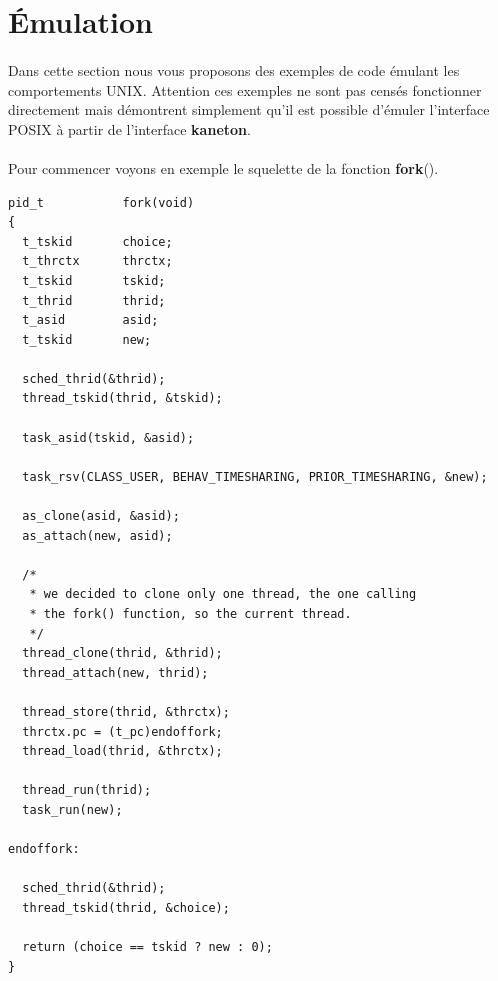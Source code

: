 \documentclass[10pt,a4wide]{article}
\begin{document}
\section{\'Emulation}

\paragraph{}

Dans cette section nous vous proposons des exemples de code \'emulant
les comportements UNIX. Attention ces exemples ne sont pas cens\'es fonctionner
directement mais d\'emontrent simplement qu'il est possible d'\'emuler
l'interface POSIX \`a partir de l'interface \textbf{kaneton}.

\paragraph{}

Pour commencer voyons en exemple le squelette de la fonction \textbf{fork}().

\begin{verbatim}
pid_t           fork(void)
{
  t_tskid       choice;
  t_thrctx      thrctx;
  t_tskid       tskid;
  t_thrid       thrid;
  t_asid        asid;
  t_tskid       new;

  sched_thrid(&thrid);
  thread_tskid(thrid, &tskid);

  task_asid(tskid, &asid);

  task_rsv(CLASS_USER, BEHAV_TIMESHARING, PRIOR_TIMESHARING, &new);

  as_clone(asid, &asid);
  as_attach(new, asid);

  /*
   * we decided to clone only one thread, the one calling
   * the fork() function, so the current thread.
   */
  thread_clone(thrid, &thrid);
  thread_attach(new, thrid);

  thread_store(thrid, &thrctx);
  thrctx.pc = (t_pc)endoffork;
  thread_load(thrid, &thrctx);

  thread_run(thrid);
  task_run(new);

endoffork:

  sched_thrid(&thrid);
  thread_tskid(thrid, &choice);

  return (choice == tskid ? new : 0);
}
\end{verbatim}

\paragraph{}
\end{document}
